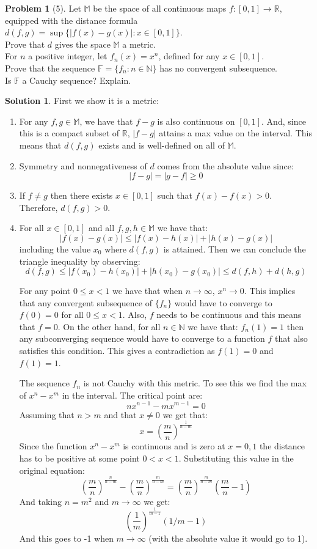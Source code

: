 \documentclass{article}
\theoremstyle{definition}
\newtheorem*{soln}{Solution}
\newtheorem*{prob}{Problem}
\theoremstyle{theorem}
\newcommand{\R}{\mathbb{R}}
\newcommand{\N}{\mathbb{N}}
\newcommand{\M}{\mathbb{M}}
\begin{document}
\begin{prob}[5]
Let $\mathbb{M}$ be the space of all continuous maps $f:[0, 1] \rightarrow \mathbb{R}$, equipped with the distance formula $d(f,g ) =  \sup\{ |f(x) - g(x)|:  x \in [0, 1]\}$.  \\Prove that $d$ gives the space $\mathbb{M}$ a metric.   \\For $n$ a positive integer, let $f_n(x) = x^n$, defined for any $x\in [0, 1]$. \\ Prove that the sequence $\mathbb{F} = \{f_n: n \in \mathbb{N}\}$ has no convergent subsequence. \\ Is $\mathbb{F}$ a Cauchy sequence? Explain. 
\end{prob}
\begin{soln}
First we show it is a metric:
    \begin{enumerate}
        \item For any $f,g\in \M$, we have that $f-g$ is also continuous on $[0,1]$. And, since this is a compact subset of $\R$, $|f-g|$ attains a max value on the interval. This means that $d(f,g)$ exists and is well-defined on all of $\M$. 
        \item Symmetry  and nonnegativeness of $d$ comes from the absolute value since:
            $$|f-g| = |g-f|\geq 0$$
        \item  If $f\neq g$ then there exists $x\in [0,1]$ such that $f(x)-f(x)>0$. Therefore, $d(f,g)>0$. 
        \item For all $x\in [0,1]$ and all $f,g,h\in \M$ we have that:
            $$|f(x) - g(x)| \leq |f(x)-h(x)| + | h(x) - g(x)|$$
            including the value  $x_0$ where $d(f,g)$ is attained. Then we can conclude the triangle inequality by observing:
            $$d(f,g) \leq |f(x_0) - h(x_0)| + | h(x_0) - g(x_0)| \leq d(f,h) + d(h,g)$$

            For any point $0\leq x <1$ we have that when $n\to \infty$, $x^n\to 0$. This implies that any convergent subsequence of $\{ f_n \}$ would have to converge to $f(0)=0$ for all $0\leq x<1$. Also, $f$ needs to be continuous  and this means that $f =0$. On the other hand, for all $n\in \N$ we have that: $f_n(1)=1$ then any subconverging sequence would have to converge to a function $f$ that also satisfies this condition. This gives a contradiction as $f(1)=0$ and $f(1)=1$.

            The sequence $f_n$ is not Cauchy with this metric. To see this we find the max of $x^n-x^m$ in the interval. The critical point are:
            $$nx^{n-1} - mx^{m-1}=0$$
            Assuming that $n>m$ and that $x\neq 0$ we get that:
            $$ x=\left( \frac mn\right)^{\frac 1{n-m}}$$
            Since the function $x^n-x^m$ is continuous and is zero at $x=0,1$ the distance has to be positive at some point $0<x<1$. Substituting this value in the original equation:
            $$\left( \frac mn\right)^{\frac n{n-m}}-\left( \frac mn\right)^{\frac m{n-m}}= \left( \frac mn\right)^{\frac m{n-m}}\left( \frac mn - 1\right)$$
            And taking $n=m^2$ and $m\to \infty $ we get:
            $$\left(\frac 1m \right)^{\frac 1{m-1}}\left(1/m - 1\right)$$
            And this goes to -1 when $m\to \infty$ (with the absolute value it would go to 1).



\end{enumerate}
\end{soln}
\end{document}

